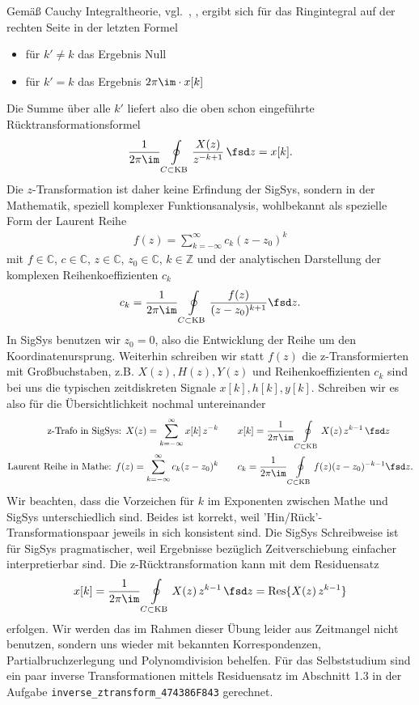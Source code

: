 Gemäß Cauchy Integraltheorie, vgl.~\cite[Kap.\,5]{Strang2007,Strang2010}, \cite[Kap.\,2]{Burg2013b},
ergibt sich für das Ringintegral auf der rechten Seite in der letzten Formel
\begin{itemize}
  \item für $k' \neq k$ das Ergebnis Null
  \item für $k' = k$ das Ergebnis $2\pi \im \cdot x[k]$
\end{itemize}
Die Summe über alle $k'$ liefert also die oben schon eingeführte Rücktransformationsformel
\begin{align}
\frac{1}{2\pi \im} \oint\limits_{C \subset \text{KB}} \frac{X(z)}{z^{-k+1}} \, \fsd z
= x[k].
\end{align}
%
Die $z$-Transformation ist daher keine Erfindung der SigSys, sondern in der
Mathematik, speziell komplexer Funktionsanalysis, wohlbekannt als spezielle
Form der Laurent Reihe~\cite[S.\,56ff]{Wunsch1972}
\begin{align}
f(z) = \sum_{k=-\infty}^{\infty} c_k (z - z_0)^k
\end{align}
mit $f\in\mathbb{C}$, $c\in\mathbb{C}$, $z\in\mathbb{C}$, $z_0\in\mathbb{C}$, $k\in\mathbb{Z}$
und der analytischen Darstellung der komplexen Reihenkoeffizienten $c_k$
\begin{align}
c_k = \frac{1}{2\pi\im}\oint\limits_{C \subset \text{KB}}
\frac{f(z)}{(z-z_0)^{k+1}}\fsd z.
\end{align}
%
In SigSys benutzen wir $z_0=0$, also die Entwicklung der Reihe um den
Koordinatenursprung.
%
Weiterhin schreiben wir statt $f(z)$ die z-Transformierten mit Großbuchstaben,
z.B. $X(z), H(z), Y(z)$ und Reihenkoeffizienten $c_k$ sind bei uns die typischen
zeitdiskreten Signale $x[k], h[k], y[k]$.
%
Schreiben wir es also für die Übersichtlichkeit nochmal untereinander
\begin{align}
\text{z-Trafo in SigSys:   } X(z) = \sum_{k=-\infty}^{\infty} x[k] \, z^{-k}\qquad
&x[k] = \frac{1}{2\pi \im} \oint\limits_{C \subset \text{KB}} X(z) \, z^{k-1} \, \fsd z\\
\text{Laurent Reihe in Mathe:   } f(z) = \sum_{k=-\infty}^{\infty} c_k (z - z_0)^k\qquad
&c_k = \frac{1}{2\pi\im}\oint\limits_{C \subset \text{KB}}
f(z) (z-z_0)^{-k-1}\fsd z.
\end{align}
Wir beachten, dass die Vorzeichen für $k$ im Exponenten zwischen Mathe und SigSys
unterschiedlich sind.
%
Beides ist korrekt, weil 'Hin/Rück'-Transformationspaar jeweils in sich
konsistent sind.
%
Die SigSys Schreibweise ist für SigSys pragmatischer, weil Ergebnisse
bezüglich Zeitverschiebung einfacher interpretierbar sind.
%
Die z-Rücktransformation kann mit dem Residuensatz
\begin{align}
x[k] = \frac{1}{2\pi \im} \oint\limits_{C \subset \text{KB}} X(z) \, z^{k-1} \, \fsd z
= \text{Res}\{X(z) \, z^{k-1}\}
\end{align}
erfolgen.
%
Wir werden das im Rahmen dieser Übung leider
aus Zeitmangel nicht benutzen, sondern uns wieder mit bekannten Korrespondenzen,
Partialbruchzerlegung und Polynomdivision behelfen.
%
Für das Selbststudium sind ein paar inverse Transformationen mittels Residuensatz
im Abschnitt 1.3 in der Aufgabe \texttt{inverse\_ztransform\_474386F843}
gerechnet.


